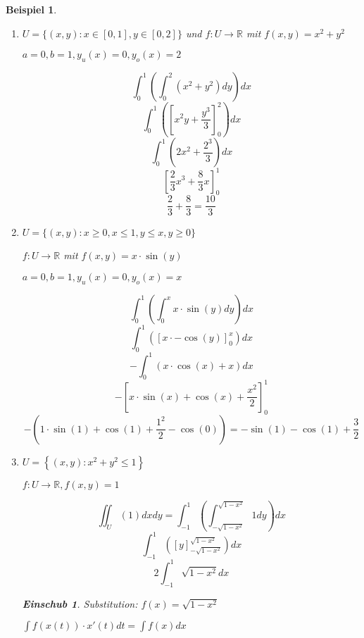 \documentclass[12pt,a4paper]{scrreprt}
\newtheorem{beispiel}[defi]{Beispiel}
\newtheorem*{einschub}{Einschub}
\begin{document}
	\begin{beispiel}
		\begin{enumerate}[label=\emph{(\roman*)}]

			\item $U=\{(x,y):x \in [0,1], y \in [0,2]\}$ und $f:U\to\mathbb{R}$ mit $f(x,y)=x^2+y^2$

				$a=0,b=1,y_u(x)=0,y_o(x)=2$

				\[\int^1_0 \left(\int^{2}_{0} (x^2+y^2)dy\right)dx\]
				\[\int^1_0 \left({\left[x^2y+\frac{y^3}{3}\right]}^{2}_{0}\right)dx\]
				\[\int^1_0 \left(2x^2+\frac{2^3}{3}\right)dx\]
				\[{\left[\frac{2}{3}x^3+\frac{8}{3}x\right]}^1_0\]
				\[\frac{2}{3}+\frac{8}{3}=\frac{10}{3}\]

		\item $U=\{(x,y):x \geq 0, x \leq 1, y \leq x, y \geq 0\}$

			$f:U\to\mathbb{R}$ mit $f(x,y)=x\cdot\sin(y)$

			$a=0,b=1,y_u(x)=0,y_o(x)=x$

			\[\int^1_0 \left(\int^{x}_{0} x\cdot\sin(y)dy\right)dx\]
			\[\int^1_0 \left({\left[x\cdot-\cos(y)\right]}^{x}_{0}\right)dx\]
			\[-\int^1_0 \left(x\cdot\cos(x)+x\right)dx\]
			\[-{\left[x\cdot\sin(x)+\cos(x)+\frac{x^2}{2}\right]}^1_0\]
			\[-\left(1\cdot\sin(1)+\cos(1)+\frac{1^2}{2}-\cos(0)\right)=-\sin(1)-\cos(1)+\frac{3}{2}\]

		\item $U=\left\{(x,y):x^2+y^2\le1\right\}$
		
		$f:U\to\mathbb{R},f(x,y)=1$


		\[\iint_U\left(1\right)dxdy=\int_{-1}^1 \left(\int_{-\sqrt{1-x^2}}^{\sqrt{1-x^2}}1dy\right)dx\]
		\[\int_{-1}^1 \left({\left[y\right]}_{-\sqrt{1-x^2}}^{\sqrt{1-x^2}}\right)dx\]
		\[2\int_{-1}^1 \sqrt{1-x^2}dx\]

		\begin{einschub}
			Substitution: $f(x)=\sqrt{1-x^2}$

			\(\int f(x(t))\cdot x'(t)dt=\int f(x)dx\)
			

\end{einschub}
\end{enumerate}
\end{beispiel}
\end{document}
